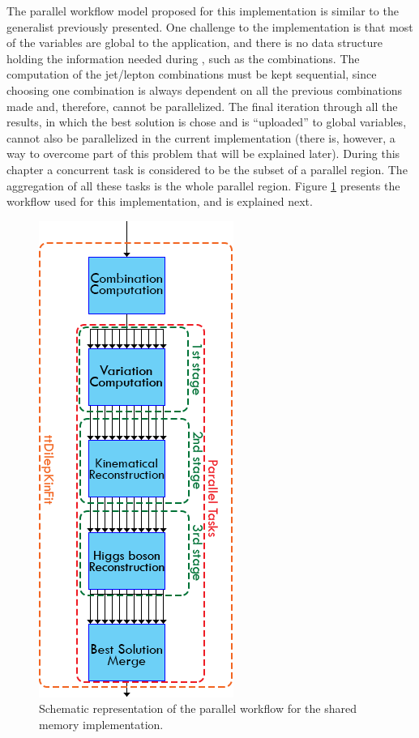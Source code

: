 The parallel workflow model proposed for this implementation is similar to the generalist previously presented. One challenge to the implementation is that most of the variables are global to the application, and there is no data structure holding the information needed during \ttDilepKinFit, such as the combinations. The computation of the jet/lepton combinations must be kept sequential, since choosing one combination is always dependent on all the previous combinations made and, therefore, cannot be parallelized. The final iteration through all the results, in which the best solution is chose and is ``uploaded'' to global variables, cannot also be parallelized in the current implementation (there is, however, a way to overcome part of this problem that will be explained later). During this chapter a concurrent task is considered to be the subset of a parallel region. The aggregation of all these tasks is the whole parallel region. Figure \ref{fig:SharedMemPipeline} presents the workflow used for this implementation, and is explained next.

\begin{figure}[!htp]
	\begin{center}
		\includegraphics[scale=0.5]{../../common/img/sharedmem_pipeline.png}
		\caption{Schematic representation of the parallel \ttDilepKinFit workflow for the shared memory implementation.}
		\label{fig:SharedMemPipeline}
	\end{center}
\end{figure}

